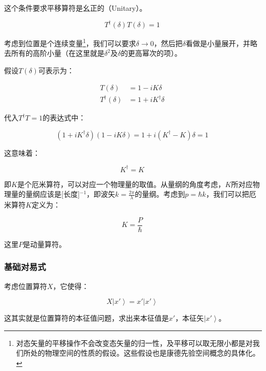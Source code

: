 这个条件要求平移算符是幺正的（Unitary）。

\begin{equation}
T^\dagger (\delta) T (\delta ) =  1~
\end{equation}

考虑到位置是个连续变量\footnote{对态矢量的平移操作不会改变态矢量的归一性，及平移可以取无限小都是对我们所处的物理空间的性质的假设。这些假设也是康德先验空间概念的具体化。}，我们可以要求$\delta \to 0$，然后把$\delta$看做是小量展开，并略去所有的高阶小量（在这里就是$\delta^2$及$\delta$的更高幂次的项）。

假设$T(\delta)$可表示为：

\begin{align}
T(\delta) & =  1- i K \delta \\
T^\dagger (\delta) & =  1+ i K^\dagger \delta~
\end{align}

代入$T^\dagger T =1$的表达式中：

\begin{equation}
\left( 1+ i K^\dagger \delta \right) \left( 1- i K \delta \right) = 1 + i \left( K^\dagger - K \right) \delta = 1~
\end{equation}

这意味着：

\begin{equation}
K^\dagger = K~
\end{equation}

即$K$是个厄米算符，可以对应一个物理量的取值。从量纲的角度考虑，$K$所对应物理量的量纲应该是[长度]$^{-1}$，即波矢$k = \frac{2 \pi}{ \lambda }$的量纲。考虑到$p = \hbar k$，我们可以把厄米算符$K$定义为：

\begin{equation}
K = \frac{P}{\hbar}~
\end{equation}

这里$P$是动量算符。

\subsubsection{基础对易式}

考虑位置算符$X$，它使得：

\begin{equation}
X \left| x' \right\rangle = x' \left| x' \right\rangle~
\end{equation}

这其实就是位置算符的本征值问题，求出来本征值是$x'$，本征矢$\left| x' \right\rangle$。

